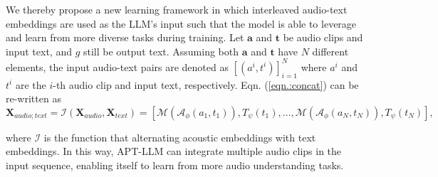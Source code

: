 \documentclass{article} %
\begin{document}
We thereby propose a new learning framework in which interleaved audio-text embeddings are used as the LLM's input such that the model is able to leverage and learn from more diverse tasks during training. Let $\mathbf{a}$ and $\mathbf{t}$ be audio clips and input text, and $g$ still be output text. Assuming both $\mathbf{a}$ and $\mathbf{t}$ have $N$ different elements, the input audio-text pairs are denoted as $[(a^i, t^i)]_{i=1}^N$ where $a^i$ and $t^i$ are the $i$-th audio clip and input text, respectively. Eqn. (\ref{eqn.:concat}) can be re-written as
\begin{equation} \label{eqn.:interleave}
    \mathbf{X}_{audio;text}\!=\!\mathcal{I}(\mathbf{X}_{audio}, \mathbf{X}_{text}) = [\mathcal{M}(\mathcal{A}_{\phi}(a_{1}, t_{1})), T_{\psi}(t_{1}), \ldots, \mathcal{M}(\mathcal{A}_{\phi}(a_{N}, t_{N})), T_{\psi}(t_{N})],
\end{equation}

where $\mathcal{I}$ is the function that alternating acoustic embeddings with text embeddings. In this way, APT-LLM can integrate multiple audio clips in the input sequence, enabling itself to learn from more audio understanding tasks.

\end{document}
